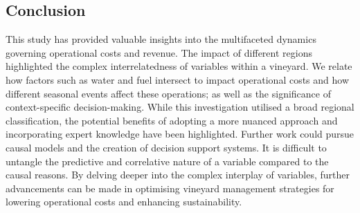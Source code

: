 \documentclass[review,12pt,authoryear]{elsarticle}
\begin{document}
\begin{linenumbers}
\fi

\section{Conclusion}

This study has provided valuable insights into the multifaceted dynamics governing operational costs and revenue. The impact of different regions highlighted the complex interrelatedness of variables within a vineyard. We relate how factors such as water and fuel intersect to impact operational costs and how different seasonal events affect these operations; as well as the significance of context-specific decision-making. While this investigation utilised a broad regional classification, the potential benefits of adopting a more nuanced approach and incorporating expert knowledge have been highlighted. Further work could pursue causal models and the creation of decision support systems. It is difficult to untangle the predictive and correlative nature of a variable compared to the causal reasons. By delving deeper into the complex interplay of variables, further advancements can be made in optimising vineyard management strategies for lowering operational costs and enhancing sustainability.






\end{linenumbers}
\end{document}
